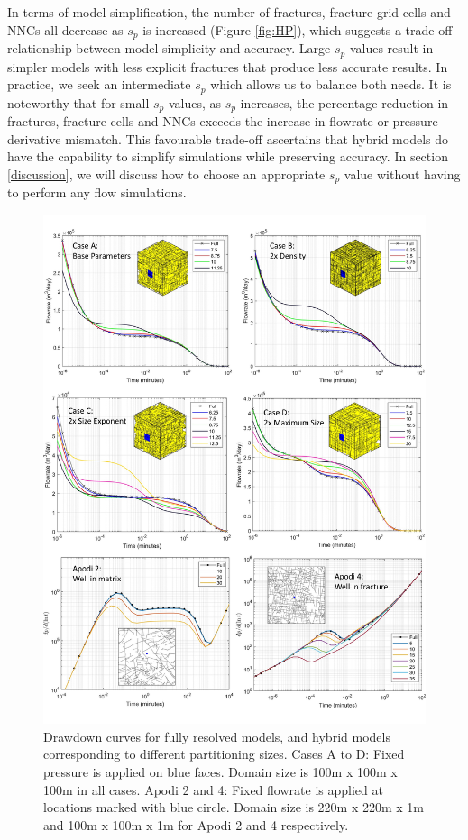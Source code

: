 \documentclass[draft]{agujournal2018}
\begin{document}
In terms of model simplification, the number of fractures, fracture grid cells and NNCs all decrease as $s_p$ is increased (Figure \ref{fig:HP}), which suggests a trade-off relationship between model simplicity and accuracy. Large $s_p$ values result in simpler models with less explicit fractures that produce less accurate results. In practice, we seek an intermediate $s_p$ which allows us to balance both needs. It is noteworthy that for small $s_p$ values, as $s_p$ increases, the percentage reduction in fractures, fracture cells and NNCs exceeds the increase in flowrate or pressure derivative mismatch. This favourable trade-off ascertains that hybrid models do have the capability to simplify simulations while preserving accuracy. In section \ref{discussion}, we will discuss how to choose an appropriate $s_p$ value without having to perform any flow simulations.

\begin{figure}[h]
	\centering
	
	\includegraphics[width=\textwidth]{DD_main_V.jpg}
	
	\caption{Drawdown curves for fully resolved models, and hybrid models corresponding to different partitioning sizes. Cases A to D: Fixed pressure is applied on blue faces. Domain size is 100m x 100m x 100m in all cases. Apodi 2 and 4: Fixed flowrate is applied at locations marked with blue circle. Domain size is 220m x 220m x 1m and 100m x 100m x 1m for Apodi 2 and 4 respectively.}
	\label{fig:DD}
\end{figure}
\end{document}
